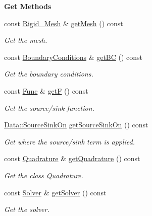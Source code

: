 \begin{Indent}{\bf Get Methods}\par
\begin{DoxyCompactItemize}
\item 
const \hyperlink{classFVCode3D_1_1Rigid__Mesh}{Rigid\+\_\+\+Mesh} \& \hyperlink{classFVCode3D_1_1Problem_ad9207d4b7e6d21029cdc62a6a70bbba9}{get\+Mesh} () const 
\begin{DoxyCompactList}\small\item\em Get the mesh. \end{DoxyCompactList}\item 
const \hyperlink{classFVCode3D_1_1BoundaryConditions}{Boundary\+Conditions} \& \hyperlink{classFVCode3D_1_1Problem_a283acafd88aa0702c43e2bfb8373f76c}{get\+BC} () const 
\begin{DoxyCompactList}\small\item\em Get the boundary conditions. \end{DoxyCompactList}\item 
const \hyperlink{namespaceFVCode3D_a38fa3b2520ad364d2c3d56ea5077826a}{Func} \& \hyperlink{classFVCode3D_1_1Problem_a28a5533941f1051fd787e410c20b8e54}{getF} () const 
\begin{DoxyCompactList}\small\item\em Get the source/sink function. \end{DoxyCompactList}\item 
\hyperlink{classFVCode3D_1_1Data_a4d66e2e205b350cb240820540339e1a3}{Data\+::\+Source\+Sink\+On} \hyperlink{classFVCode3D_1_1Problem_a898e953a7cc76102534dc95546e761b5}{get\+Source\+Sink\+On} () const 
\begin{DoxyCompactList}\small\item\em Get where the source/sink term is applied. \end{DoxyCompactList}\item 
const \hyperlink{classFVCode3D_1_1Quadrature}{Quadrature} \& \hyperlink{classFVCode3D_1_1Problem_abea0ef68928db90741723e650f4ae05d}{get\+Quadrature} () const 
\begin{DoxyCompactList}\small\item\em Get the class \hyperlink{classFVCode3D_1_1Quadrature}{Quadrature}. \end{DoxyCompactList}\item 
const \hyperlink{classFVCode3D_1_1Solver}{Solver} \& \hyperlink{classFVCode3D_1_1Problem_a39e64d24161ea699046d4e670fbc4eab}{get\+Solver} () const 
\begin{DoxyCompactList}\small\item\em Get the solver. \end{DoxyCompactList}\item 

\end{DoxyCompactItemize}
\end{Indent}
